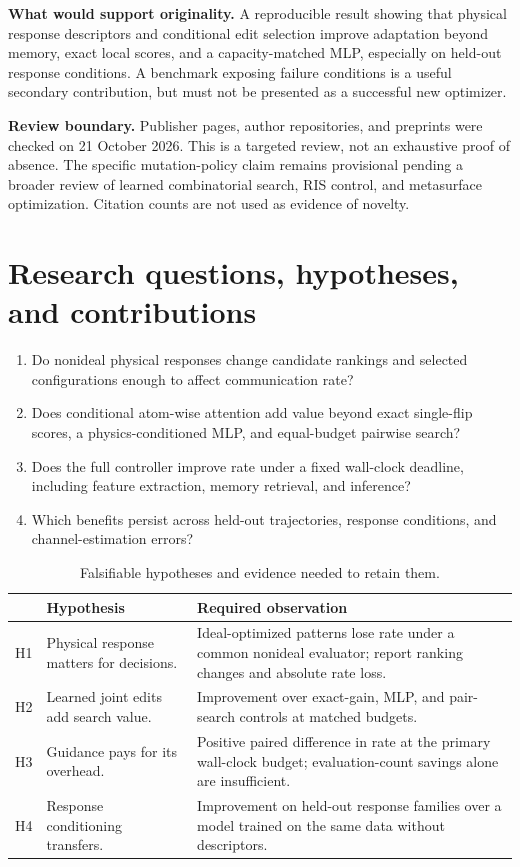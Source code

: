 \documentclass[conference]{IEEEtran}
\begin{document}
\textbf{What would support originality.} A reproducible result showing that physical response descriptors and conditional edit selection improve adaptation beyond memory, exact local scores, and a capacity-matched MLP, especially on held-out response conditions. A benchmark exposing failure conditions is a useful secondary contribution, but must not be presented as a successful new optimizer.

\textbf{Review boundary.} Publisher pages, author repositories, and preprints were checked on 21 October 2026. This is a targeted review, not an exhaustive proof of absence. The specific mutation-policy claim remains provisional pending a broader review of learned combinatorial search, RIS control, and metasurface optimization. Citation counts are not used as evidence of novelty.

\section{Research questions, hypotheses, and contributions}
\begin{enumerate}[label=\textbf{RQ\arabic*.}]
\item Do nonideal physical responses change candidate rankings and selected configurations enough to affect communication rate?
\item Does conditional atom-wise attention add value beyond exact single-flip scores, a physics-conditioned MLP, and equal-budget pairwise search?
\item Does the full controller improve rate under a fixed wall-clock deadline, including feature extraction, memory retrieval, and inference?
\item Which benefits persist across held-out trajectories, response conditions, and channel-estimation errors?
\end{enumerate}

\begin{table}[t]
\caption{Falsifiable hypotheses and evidence needed to retain them.}
\small
\begin{tabularx}{\linewidth}{@{}p{10mm}YY@{}}
\toprule
 & Hypothesis & Required observation\\
\midrule
H1 & Physical response matters for decisions. & Ideal-optimized patterns lose rate under a common nonideal evaluator; report ranking changes and absolute rate loss.\\
H2 & Learned joint edits add search value. & Improvement over exact-gain, MLP, and pair-search controls at matched budgets.\\
H3 & Guidance pays for its overhead. & Positive paired difference in rate at the primary wall-clock budget; evaluation-count savings alone are insufficient.\\
H4 & Response conditioning transfers. & Improvement on held-out response families over a model trained on the same data without descriptors.\\
\bottomrule
\end{tabularx}
\end{table}
\end{document}
